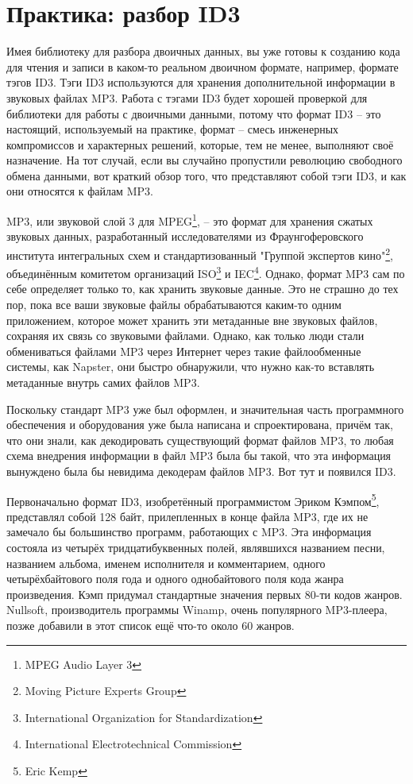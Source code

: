 \chapter{Практика: разбор ID3}
\label{ch:25}

Имея библиотеку для разбора двоичных данных, вы уже готовы к созданию кода для чтения и
записи в каком-то реальном двоичном формате, например, формате тэгов ID3. Тэги ID3
используются для хранения дополнительной информации в звуковых файлах MP3. Работа с тэгами
ID3 будет хорошей проверкой для библиотеки для работы с двоичными данными, потому что
формат ID3 -- это настоящий, используемый на практике, формат -- смесь инженерных
компромиссов и характерных решений, которые, тем не менее, выполняют своё назначение. На
тот случай, если вы случайно пропустили революцию свободного обмена данными, вот краткий
обзор того, что представляют собой тэги ID3, и как они относятся к файлам MP3.

MP3, или звуковой слой 3 для MPEG\footnote{MPEG Audio Layer 3}, -- это формат для хранения
сжатых звуковых данных, разработанный исследователями из Фраунгоферовского института
интегральных схем и стандартизованный "Группой экспертов кино"\footnote{Moving Picture
  Experts Group}, объединённым комитетом организаций ISO\footnote{International
  Organization for Standardization} и IEC\footnote{International Electrotechnical
  Commission}. Однако, формат MP3 сам по себе определяет только то, как хранить звуковые
данные. Это не страшно до тех пор, пока все ваши звуковые файлы обрабатываются каким-то
одним приложением, которое может хранить эти метаданные вне звуковых файлов, сохраняя их
связь со звуковыми файлами. Однако, как только люди стали обмениваться файлами MP3 через
Интернет через такие файлообменные системы, как Napster, они быстро обнаружили, что нужно
как-то вставлять метаданные внутрь самих файлов MP3.

Поскольку стандарт MP3 уже был оформлен, и значительная часть программного обеспечения и
оборудования уже была написана и спроектирована, причём так, что они знали, как
декодировать существующий формат файлов MP3, то любая схема внедрения информации в файл
MP3 была бы такой, что эта информация вынуждено была бы невидима декодерам файлов MP3. Вот
тут и появился ID3.

Первоначально формат ID3, изобретённый программистом Эриком Кэмпом\footnote{Eric Kemp},
представлял собой 128 байт, прилепленных в конце файла MP3, где их не замечало бы
большинство программ, работающих с MP3. Эта информация состояла из четырёх
тридцатибуквенных полей, являвшихся названием песни, названием альбома, именем исполнителя
и комментарием, одного четырёхбайтового поля года и одного однобайтового поля кода жанра
произведения. Кэмп придумал стандартные значения первых 80-ти кодов жанров. Nullsoft,
производитель программы Winamp, очень популярного MP3-плеера, позже добавили в этот список
ещё что-то около 60 жанров.


